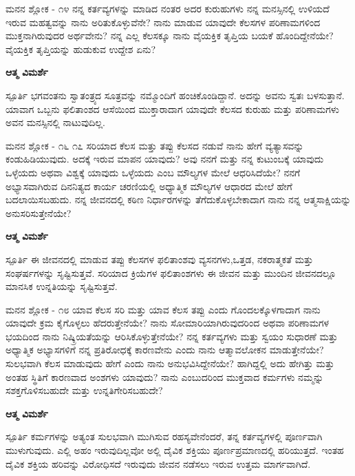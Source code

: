\begin{mananam}{\mananamfont ಮನನ ಶ್ಲೋಕ - ೧೪}
\mananamtext ನನ್ನ ಕರ್ತವ್ಯಗಳನ್ನು ಮಾಡಿದ ನಂತರ ಅದರ ಕುರುಹುಗಳು ನನ್ನ ಮನಸ್ಸಿನಲ್ಲಿ ಉಳಿಯದೆ ಇರುವ ಮಹತ್ವವನ್ನು ನಾನು ಅರಿತುಕೊಳ್ಳುವೆನೇ? ನಾನು ಮಾಡುವ ಯಾವುದೇ ಕೆಲಸಗಳ ಪರಿಣಾಮಗಳಿಂದ ಮುಕ್ತನಾಗಿರುವುದರ ಅರ್ಥವೇನು? ನನ್ನ ಎಲ್ಲ ಕೆಲಸಕ್ಕೂ ನಾನು ವೈಯಕ್ತಿಕ ತೃಪ್ತಿಯ ಬಯಕೆ ಹೊಂದಿದ್ದೇನೆಯೇ? ವೈಯಕ್ತಿಕ ತೃಪ್ತಿಯನ್ನು ಹುಡುಕುವ ಉದ್ದೇಶ ಏನು?
\end{mananam}
\WritingHand\enspace\textbf{ಆತ್ಮ ವಿಮರ್ಶೆ}\\
\begin{inspiration}{\mananamfont ಸ್ಪೂರ್ತಿ}
\mananamtext ಭಗವಂತನು ಸ್ವಾತಂತ್ರ್ಯದ ಸೂತ್ರವನ್ನು ನಮ್ಮೊಂದಿಗೆ ಹಂಚಿಕೊಂಡಿದ್ದಾನೆ. ಅದನ್ನು ಅವನು ಸ್ವತಃ ಬಳಸುತ್ತಾನೆ. ಯಾವಾಗ ಒಬ್ಬನು  ಫಲಿತಾಂಶದ ಆಸೆಯಿಂದ ಮುಕ್ತಾರಾದಾಗ ಯಾವುದೇ ಕೆಲಸದ ಕುರುಹು ಮತ್ತು ಪರಿಣಾಮಗಳು  ಅವನ ಮನಸ್ಸಿನಲ್ಲಿ ನಾಟುವುದಿಲ್ಲ.
\end{inspiration}
\newpage

\begin{mananam}{\mananamfont ಮನನ ಶ್ಲೋಕ - ೧೬ ೧೭}
\mananamtext ಸರಿಯಾದ ಕೆಲಸ ಮತ್ತು ತಪ್ಪು ಕೆಲಸದ ನಡುವೆ ನಾನು ಹೇಗೆ ವ್ಯತ್ಯಾಸವನ್ನು ಕಂಡುಹಿಡಿಯುವುದು. ಅದಕ್ಕೆ ಇರುವ ಮಾಪನ ಯಾವುದು? ಅವು ನನಗೆ ಮತ್ತು ನನ್ನ ಕುಟುಂಬಕ್ಕೆ ಯಾವುದು ಒಳ್ಳೆಯದು ಅಥವಾ ವಿಶ್ವಕ್ಕೆ ಯಾವುದು ಒಳ್ಳೆಯದು ಎಂಬ ಮೌಲ್ಯಗಳ ಮೇಲೆ ಆಧರಿಸಿದೆಯೇ? ನನಗೆ ಅಭ್ಯಾಸವಾಗಿರುವ ದಿನನಿತ್ಯದ ಕಾರ್ಯ ಚರಣಿಯಲ್ಲಿ ಅಧ್ಯಾತ್ಮಿಕ ಮೌಲ್ಯಗಳ ಆಧಾರದ ಮೇಲೆ ಹೇಗೆ ಬದಲಾಯಿಸಬಹುದು. ನನ್ನ ಜೀವನದಲ್ಲಿ ಕಠಿಣ ನಿರ್ಧಾರಗಳನ್ನು ತೆಗೆದುಕೊಳ್ಳಬೇಕಾದಾಗ ನಾನು ನನ್ನ ಆತ್ಮಸಾಕ್ಷಿಯನ್ನು ಅನುಸರಿಸುತ್ತೇನೆಯೇ?
\end{mananam}
\WritingHand\enspace\textbf{ಆತ್ಮ ವಿಮರ್ಶೆ}\\
\begin{inspiration}{\mananamfont ಸ್ಪೂರ್ತಿ}
\mananamtext ಈ ಜೀವನದಲ್ಲಿ ಮಾಡುವ ತಪ್ಪು ಕೆಲಸಗಳ ಫಲಿತಾಂಶವು ವ್ಯಸನಗಳು,ಒತ್ತಡ, ನಕರಾತ್ಮಕತೆ ಮತ್ತು ಸಂಘರ್ಷಗಳನ್ನು ಸೃಷ್ಟಿಸುತ್ತವೆ. ಸರಿಯಾದ ಕ್ರಿಯೆಗಳ ಫಲಿತಾಂಶಗಳು ಈ ಜೀವನ ಮತ್ತು ಮುಂದಿನ ಜೀವನದಲ್ಲೂ ಮಾನಸಿಕ ಉನ್ನತಿಯನ್ನು ಸೃಷ್ಟಿಸುತ್ತವೆ.
\end{inspiration}
\newpage

\begin{mananam}{\mananamfont ಮನನ ಶ್ಲೋಕ - ೧೮}
\mananamtext ಯಾವ ಕೆಲಸ ಸರಿ ಮತ್ತು ಯಾವ ಕೆಲಸ ತಪ್ಪು ಎಂದು ಗೊಂದಲಕ್ಕೊಳಗಾದಾಗ ನಾನು ಯಾವುದೇ ಕ್ರಮ ಕೈಗೊಳ್ಳಲು ಹೆದರುತ್ತೇನೆಯೇ? ನಾನು  ಸೋಮಾರಿಯಾಗಿರುವುದರಿಂದ ಅಥವಾ ಪರಿಣಾಮಗಳ ಭಯದಿಂದ ನಾನು ನಿಷ್ಕ್ರಿಯತೆಯನ್ನು ಆರಿಸಿಕೊಳ್ಳುತ್ತೇನೆಯೇ? ನನ್ನ ಕರ್ತವ್ಯಗಳು ಮತ್ತು ಸ್ವಯಂ ಸುಧಾರಣೆ ಮತ್ತು ಅಧ್ಯಾತ್ಮಿಕ ಅಭ್ಯಾಸಗಳಿಗೆ ನನ್ನ ಪ್ರತಿರೋಧಕ್ಕೆ ಕಾರಣವೇನು ಎಂದು ನಾನು ಆತ್ಮಾವಲೋಕನ ಮಾಡುತ್ತೇನೆಯೇ?\\
ಸುಲಭವಾಗಿ ಕೆಲಸ ಮಾಡುವುದು ಹೇಗೆ ಎಂದು ನಾನು ಅನುಭವಿಸಿದ್ದೇನೆಯೇ? ಹಾಗಿದ್ದಲ್ಲಿ ಅದು ಹೇಗಿತ್ತು ಮತ್ತು ಅಂತಹ ಸ್ಥಿತಿಗೆ ಕಾರಣವಾದ ಅಂಶಗಳು ಯಾವುದು? ನಾನು ಎಂಬುದರಿಂದ ಮುಕ್ತವಾದ ಕರ್ಮಗಳು ನಮ್ಮನ್ನು ಸಶಕ್ತಗೊಳಿಸಬಹುದೇ ಮತ್ತು ಉನ್ನತಿಗೇರಿಸಬಹುದೇ?
\end{mananam}
\WritingHand\enspace\textbf{ಆತ್ಮ ವಿಮರ್ಶೆ}\\
\begin{inspiration}{\mananamfont ಸ್ಪೂರ್ತಿ}
\mananamtext ಕರ್ಮಗಳನ್ನು ಅತ್ಯಂತ ಸುಲಭವಾಗಿ ಮುಗಿಸುವ ರಹಸ್ಯವೇನೆಂದರೆ, ತನ್ನ ಕರ್ತವ್ಯಗಳಲ್ಲಿ ಪೂರ್ಣವಾಗಿ ಮುಳುಗುವುದು. ಎಲ್ಲಿ ಅಹಂ ಇರುವುದಿಲ್ಲವೋ ಅಲ್ಲಿ ದೈವಿಕ ಶಕ್ತಿಯು ಪೂರ್ಣಪ್ರಮಾಣದಲ್ಲಿ ಹರಿಯುತ್ತದೆ. ಇಂತಹ ದೈವಿಕ ಶಕ್ತಿಯ ಹರಿವನ್ನು ವಿರೋಧಿಸದೆ ಇರುವುದು ಜೀವನ ನಡೆಸಲು ಇರುವ ಉತ್ತಮ ಮಾರ್ಗವಾಗಿದೆ.
\end{inspiration}
\newpage

